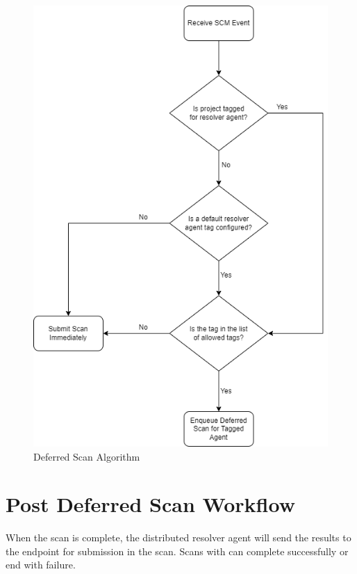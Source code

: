 \begin{figure}[ht]
  \includegraphics[width=\textwidth]{graphics/cxoneflow-diagrams-Deferred Scan Algorithm.png}
  \caption{Deferred Scan Algorithm}
  \label{fig:deferred-scan-flowchart}
\end{figure}


\section{Post Deferred Scan Workflow}

When the \scaresolver scan is complete, the distributed resolver agent will send the results
to the \cxoneflow endpoint for submission in the \cxone scan.  Scans with \scaresolver can
complete successfully or end with failure.

